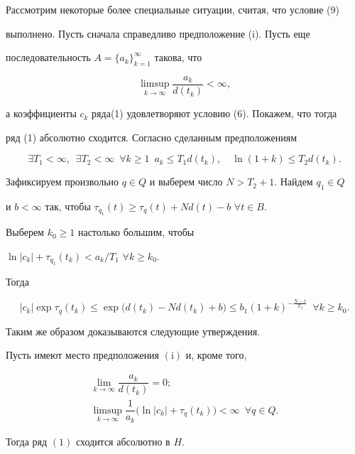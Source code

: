 Рассмотрим некоторые более специальные ситуации, считая, что условие (9)


выполнено. Пусть сначала справедливо предположение (i). Пусть еще


последовательность $A=\bigl\{a_k\bigr\}_{k=1}^{\infty}$ такова, что


\begin{equation}


\limsup\limits_{k\to\infty}\dfrac{a_k}{d(t_k)}<\infty,


\end{equation}


а коэффициенты $c_k$ ряда(1) удовлетворяют условию (6). Покажем, что тогда


ряд (1) абсолютно сходится. Согласно сделанным предположениям


$$


\exists T_1<\infty,\;\ \exists T_2<\infty\;\ \forall k\geqslant 1\ \;


a_k\leqslant T_1d(t_k),\quad \ln(1+k)\leqslant T_2d(t_k).


$$


Зафиксируем произвольно $q\in Q$ и выберем число $N>T_2+1$. Найдем $q_1\in Q$


и $b<\infty$ так, чтобы $\tau_{q_1}(t)\geqslant \tau_q(t)


+Nd(t)-b$ $\forall t\in B$.


Выберем $k_0\geqslant 1$ настолько большим, чтобы 


$\ln|c_k|+\tau_{q_1}(t_k)<a_k/T_1$ $\forall k \geqslant k_0$.


Тогда 


$$


|c_k|\exp \tau_q(t_k)\leqslant \exp\bigl(d(t_k)-Nd(t_k)+b\bigr)\leqslant


b_1(1+k)^{-\frac{N-1}{T_2}}\ \; \forall k\geqslant k_0.


$$





Таким же образом доказываются следующие утверждения.





\begin{prop}


Пусть имеют место предположения $(\mathrm i)$ и, кроме того,


\begin{gather}


\lim\limits_{k\to\infty}\dfrac{a_k}{d(t_k)}=0;\\


%


 \limsup\limits_{k\to \infty}\dfrac{1}{a_k}\bigl(


\ln|c_k|+\tau_q(t_k)\bigr)<\infty\ \; \forall q\in Q.


\end{gather}


Тогда ряд $(1)$ сходится абсолютно в $H$.


\end{prop}






